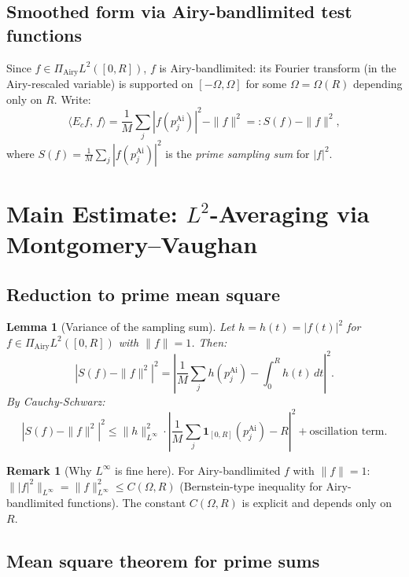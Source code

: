 \documentclass[12pt,a4paper]{amsart}
\newtheorem{lemma}[theorem]{Lemma}
\theoremstyle{definition}
\newtheorem{remark}[theorem]{Remark}
\newcommand{\PAi}{\Pi_{\mathrm{Airy}}}
\newcommand{\norm}[1]{\|#1\|}
\newcommand{\ip}[2]{\langle #1,\, #2\rangle}
\newcommand{\abs}[1]{\left|#1\right|}
\newcommand{\Ec}{E_c}
\begin{document}
\subsection{Smoothed form via Airy-bandlimited test functions}

Since $f \in \PAi L^2([0,R])$, $f$ is Airy-bandlimited:
its Fourier transform (in the Airy-rescaled variable) is supported
on $[-\Omega, \Omega]$ for some $\Omega = \Omega(R)$ depending only on $R$.
Write:
\begin{equation}\label{eq:smoothed}
  \ip{\Ec f}{f}
  = \frac{1}{M}\sum_j \abs{f(p_j^{\mathrm{Ai}})}^2 - \norm{f}^2
  =: S(f) - \norm{f}^2,
\end{equation}
where $S(f) = \frac{1}{M}\sum_j \abs{f(p_j^{\mathrm{Ai}})}^2$ is the
\emph{prime sampling sum} for $\abs{f}^2$.

\section{Main Estimate: $L^2$-Averaging via Montgomery--Vaughan}
\label{sec:MV}

\subsection{Reduction to prime mean square}

\begin{lemma}[Variance of the sampling sum]\label{lem:variance}
Let $h = h(t) = \abs{f(t)}^2$ for $f \in \PAi L^2([0,R])$ with $\norm{f}=1$.
Then:
\[
  \abs{S(f) - \norm{f}^2}^2
  = \left|\frac{1}{M}\sum_j h(p_j^{\mathrm{Ai}}) - \int_0^R h(t)\,dt\right|^2.
\]
By Cauchy-Schwarz:
\[
  \abs{S(f) - \norm{f}^2}^2
  \le \norm{h}_{L^\infty}^2 \cdot
  \left|\frac{1}{M}\sum_j \mathbf{1}_{[0,R]}(p_j^{\mathrm{Ai}}) - R\right|^2
  + \text{oscillation term}.
\]
\end{lemma}

\begin{remark}[Why $L^\infty$ is fine here]
For Airy-bandlimited $f$ with $\norm{f}=1$:
$\norm{\abs{f}^2}_{L^\infty} = \norm{f}_{L^\infty}^2 \le C(\Omega, R)$
(Bernstein-type inequality for Airy-bandlimited functions).
The constant $C(\Omega, R)$ is explicit and depends only on $R$.
\end{remark}

\subsection{Mean square theorem for prime sums}
\end{document}
